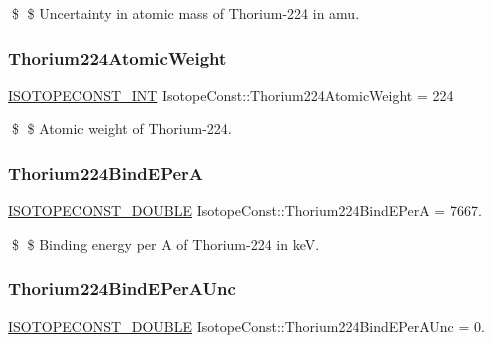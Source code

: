 \$ \$ Uncertainty in atomic mass of Thorium-\/224 in amu. \mbox{\label{group___isotope_const-_thorium-_th224_gaaf26161e3f088320de6851ae0ae28f27}} 
\subsubsection{\texorpdfstring{Thorium224\+Atomic\+Weight}{Thorium224AtomicWeight}}
{\footnotesize\ttfamily \mbox{\hyperlink{group___isotope_const-_macros_ga5f18360b3e99483a35c32d789e62621c}{I\+S\+O\+T\+O\+P\+E\+C\+O\+N\+S\+T\+\_\+\+I\+NT}} Isotope\+Const\+::\+Thorium224\+Atomic\+Weight = 224}

\$ \$ Atomic weight of Thorium-\/224. \mbox{\label{group___isotope_const-_thorium-_th224_ga63ea97049204c4acf2021a97ed9e10d4}} 
\subsubsection{\texorpdfstring{Thorium224\+Bind\+E\+PerA}{Thorium224BindEPerA}}
{\footnotesize\ttfamily \mbox{\hyperlink{group___isotope_const-_macros_ga8f45a7272ce02c0b4c65c44636ed719a}{I\+S\+O\+T\+O\+P\+E\+C\+O\+N\+S\+T\+\_\+\+D\+O\+U\+B\+LE}} Isotope\+Const\+::\+Thorium224\+Bind\+E\+PerA = 7667.}

\$ \$ Binding energy per A of Thorium-\/224 in keV. \mbox{\label{group___isotope_const-_thorium-_th224_gae00dc7ae05e867c3d1dc7c1f79836d64}} 
\subsubsection{\texorpdfstring{Thorium224\+Bind\+E\+Per\+A\+Unc}{Thorium224BindEPerAUnc}}
{\footnotesize\ttfamily \mbox{\hyperlink{group___isotope_const-_macros_ga8f45a7272ce02c0b4c65c44636ed719a}{I\+S\+O\+T\+O\+P\+E\+C\+O\+N\+S\+T\+\_\+\+D\+O\+U\+B\+LE}} Isotope\+Const\+::\+Thorium224\+Bind\+E\+Per\+A\+Unc = 0.}

